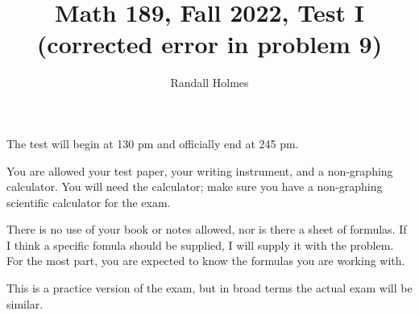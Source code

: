 \documentclass[12pt]{article}
\title{Math 189, Fall 2022, Test I (corrected error in problem 9)}
\author{Randall Holmes}
\begin{document}
\maketitle

The test will begin at 130 pm and officially end at 245 pm.

You are allowed your test paper, your writing instrument, and a non-graphing calculator.  You will need the calculator;
make sure you have a non-graphing scientific calculator for the exam.

There is no use of your book or notes allowed, nor is there a sheet of formulas.  If I think a specific fomula should be supplied, I will supply it with the problem.  For the most part, you are expected to know the formulas you are working with.


This is a practice version of the exam, but in broad terms the actual exam will be similar.
\newpage
\end{document}
